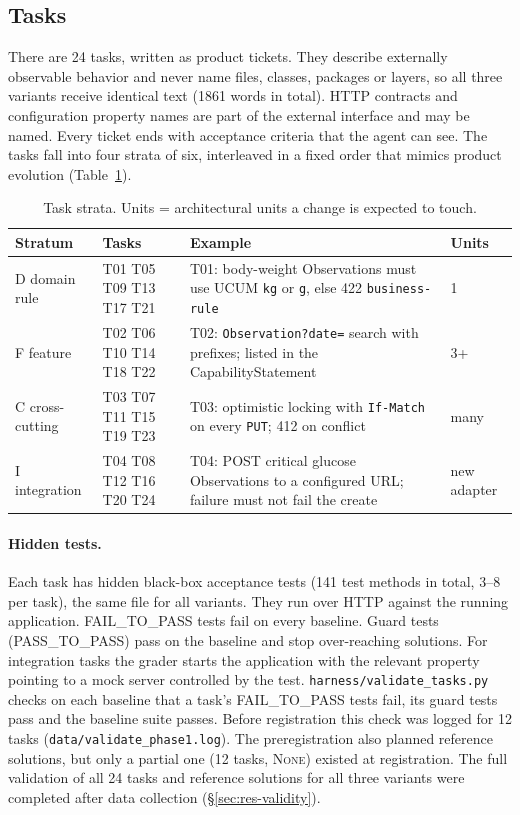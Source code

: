 \documentclass[10pt]{article}
\newcommand{\NONE}{\textsc{None}}
\newcommand{\code}[1]{\texttt{#1}}
\begin{document}
\subsection{Tasks}\label{sec:tasks}

There are 24 tasks, written as product tickets. They describe externally observable behavior and
never name files, classes, packages or layers, so all three variants receive identical text
(1861 words in total). HTTP contracts and configuration property names are part of the external
interface and may be named. Every ticket ends with acceptance criteria that the agent can see. The
tasks fall into four strata of six, interleaved in a fixed order that mimics product evolution
(Table~\ref{tab:tasks}).

\begin{table}[tbp]\centering
\caption{Task strata. Units = architectural units a change is expected to touch.}
\label{tab:tasks}
\small
\begin{tabularx}{\textwidth}{@{}lp{2.2cm}Xl@{}}
\toprule
Stratum & Tasks & Example & Units\\
\midrule
D domain rule & T01 T05 T09 T13 T17 T21 & T01: body-weight Observations must use UCUM \code{kg} or \code{g}, else 422 \code{business-rule} & 1\\
F feature & T02 T06 T10 T14 T18 T22 & T02: \code{Observation?date=} search with prefixes; listed in the CapabilityStatement & 3+\\
C cross-cutting & T03 T07 T11 T15 T19 T23 & T03: optimistic locking with \code{If-Match} on every \code{PUT}; 412 on conflict & many\\
I integration & T04 T08 T12 T16 T20 T24 & T04: POST critical glucose Observations to a configured URL; failure must not fail the create & new adapter\\
\bottomrule
\end{tabularx}
\end{table}

\paragraph{Hidden tests.} Each task has hidden black-box acceptance tests (141 test methods in total,
3--8 per task), the same file for all variants. They run over HTTP against the running application.
FAIL\_TO\_PASS tests fail on every baseline. Guard tests (PASS\_TO\_PASS) pass on the baseline and stop
over-reaching solutions. For integration tasks the grader starts the application with the relevant
property pointing to a mock server controlled by the test. \code{harness/validate\_tasks.py}
checks on each baseline that a task's FAIL\_TO\_PASS tests fail, its guard tests pass and the
baseline suite passes. Before registration this check was logged for 12 tasks
(\code{data/validate\_phase1.log}). The preregistration also planned reference solutions, but only
a partial one (12 tasks, \NONE) existed at registration. The full validation of all 24 tasks and
reference solutions for all three variants were completed after data collection
(\S\ref{sec:res-validity}).
\end{document}
